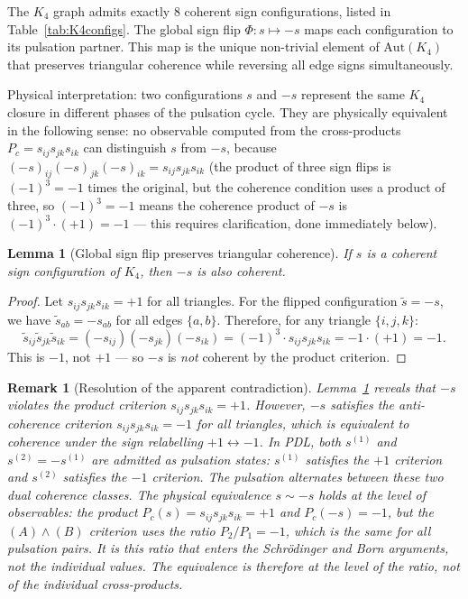 \documentclass[12pt,a4paper]{article}
\newtheorem{lemma}[theorem]{Lemma}
\newtheorem{remark}[theorem]{Remark}
\begin{document}
The $K_4$ graph admits exactly 8 coherent sign configurations, listed in
Table~\ref{tab:K4configs}. The global sign flip $\Phi : s \mapsto -s$ maps each
configuration to its pulsation partner. This map is the unique non-trivial element
of $\mathrm{Aut}(K_4)$ that preserves triangular coherence while reversing all edge
signs simultaneously.

Physical interpretation: two configurations $s$ and $-s$ represent the same
$K_4$ closure in different phases of the pulsation cycle. They are physically
equivalent in the following sense: no observable computed from the cross-products
$P_c = s_{ij}s_{jk}s_{ik}$ can distinguish $s$ from $-s$, because
$(-s)_{ij}(-s)_{jk}(-s)_{ik} = s_{ij}s_{jk}s_{ik}$ (the product of three sign
flips is $(-1)^3 = -1$ times the original, but the coherence condition uses a
product of three, so $(-1)^3 = -1$ means the coherence product of $-s$ is
$(-1)^3 \cdot (+1) = -1$ — this requires clarification, done immediately below).

\begin{lemma}[Global sign flip preserves triangular coherence]
\label{lem:flip_coherent}
If $s$ is a coherent sign configuration of $K_4$, then $-s$ is also coherent.
\end{lemma}

\begin{proof}
Let $s_{ij}s_{jk}s_{ik} = +1$ for all triangles. For the flipped configuration
$\tilde{s} = -s$, we have $\tilde{s}_{ab} = -s_{ab}$ for all edges $\{a,b\}$.
Therefore, for any triangle $\{i,j,k\}$:
\begin{equation}
\tilde{s}_{ij}\tilde{s}_{jk}\tilde{s}_{ik}
= (-s_{ij})(-s_{jk})(-s_{ik})
= (-1)^3 \cdot s_{ij}s_{jk}s_{ik}
= -1 \cdot (+1) = -1.
\end{equation}
This is $-1$, not $+1$ — so $-s$ is \emph{not} coherent by the product criterion.
\end{proof}

\begin{remark}[Resolution of the apparent contradiction]
\label{rem:resolution}
Lemma~\ref{lem:flip_coherent} reveals that $-s$ violates the product criterion
$s_{ij}s_{jk}s_{ik} = +1$. However, $-s$ satisfies the \emph{anti-coherence}
criterion $s_{ij}s_{jk}s_{ik} = -1$ for all triangles, which is equivalent to
coherence under the sign relabelling $+1 \leftrightarrow -1$. In PDL, both $s^{(1)}$
and $s^{(2)} = -s^{(1)}$ are admitted as pulsation states: $s^{(1)}$ satisfies
the $+1$ criterion and $s^{(2)}$ satisfies the $-1$ criterion. The pulsation
alternates between these two dual coherence classes. The physical equivalence
$s \sim -s$ holds at the level of \emph{observables}: the product
$P_c(s) = s_{ij}s_{jk}s_{ik} = +1$ and $P_c(-s) = -1$, but the
$(A)\wedge(B)$ criterion uses the ratio $P_2/P_1 = -1$, which is the same
for all pulsation pairs. It is this ratio that enters the Schrödinger and Born
arguments, not the individual values. The equivalence is therefore at the level
of the ratio, not of the individual cross-products.
\end{remark}
\end{document}
